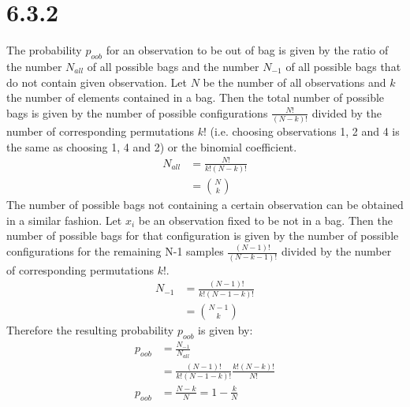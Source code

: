 \documentclass[a4paper,11pt]{article}
\theoremstyle{definition}
\theoremstyle{plain}
\theoremstyle{remark}
\begin{document}
\section*{6.3.2}
The probability $p_{oob}$ for an observation to be out of bag is given by the ratio of the number $N_{all}$ of all possible bags and the number $N_{-1}$ of all possible bags that do not contain given observation. Let $N$ be the number of all observations and $k$ the number of elements contained in a bag. Then the total number of possible bags is given by the number of possible configurations $\frac{N!}{(N-k)!}$ divided by the number of corresponding permutations $k!$ (i.e. choosing observations 1, 2 and 4 is the same as choosing 1, 4 and 2) or the binomial coefficient.
\begin{align}
N_{all} &= \frac{N!}{k!(N-k)!} \\
&= \binom{N}{k}
\end{align}
The number of possible bags not containing a certain observation can be obtained in a similar fashion. Let $x_i$ be an observation fixed to be not in a bag. Then the number of possible bags for that configuration is given by the number of possible configurations for the remaining N-1 samples $\frac{(N-1)!}{(N-k-1)!}$ divided by the number of corresponding permutations $k!$.
\begin{align}
N_{-1} &= \frac{(N-1)!}{k!(N-1-k)!} \\
&= \binom{N-1}{k}
\end{align}
Therefore the resulting probability $p_{oob}$ is given by:
\begin{align}
p_{oob} &= \frac{N_{-1}}{N_{all}} \\
&=\frac{(N-1)!}{k!(N-1-k)!}\frac{k!(N-k)!}{N!} \\
p_{oob} &= \frac{N-k}{N} = 1 - \frac{k}{N}
\end{align}
\end{document}
